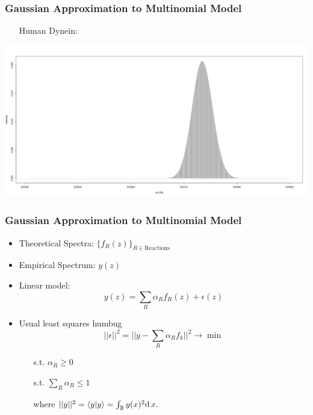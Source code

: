 \documentclass[xetex]{beamer}
\begin{document}
	\begin{frame}\frametitle{Gaussian Approximation to Multinomial Model}

		\begin{itemize}
			\item[] Human Dynein: 			
		\end{itemize}

		\begin{center}
			\includegraphics[width=.8\textwidth, keepaspectratio]{./picts/humanDynein.png}
		\end{center}
	\end{frame}

	\begin{frame}\frametitle{Gaussian Approximation to Multinomial Model}

		\begin{itemize}
			\item Theoretical Spectra: $\Big\{ f_R(z) \Big\}_{R \in \text{Reactions}}$
			\item Empirical Spectrum: $y(z)$
			\item Linear model:
			$$ y(z) = \sum_{R} \alpha_R f_R (z) + \epsilon(z)$$
			\item Usual least squares humbug
			$$ ||\epsilon||^2 = \Big|\Big| y - \sum_{R} \alpha_R f_k \Big|\Big|^2 \rightarrow \min$$
			\begin{itemize}
				\item[s.t.] $\alpha_R \geq 0$
				\item[s.t.] $\sum_R \alpha_R \leq 1$
				\item[where] $ ||y||^2 = \langle y|y \rangle =  \int_{\mathbb{R}} y(x)^2 \mathrm{d}\,x.$ 
			\end{itemize}
		\end{itemize}
	\end{frame}
\end{document}
